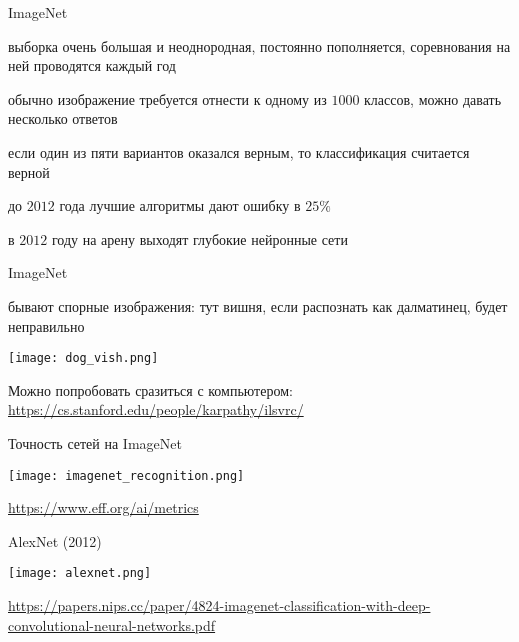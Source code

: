 \documentclass[notes,12pt, aspectratio=169]{beamer}
\newenvironment{wideitemize}{\itemize\addtolength{\itemsep}{10pt}}{\enditemize}
\begin{document}
\begin{frame}{ImageNet}
\begin{wideitemize}
\item  выборка очень большая и неоднородная, постоянно пополняется, соревнования на ней проводятся каждый год

\item обычно изображение требуется отнести к одному из $1000$ классов, можно давать несколько ответов

\item если один из пяти вариантов оказался верным, то классификация считается верной

\item до $2012$ года лучшие алгоритмы дают ошибку в $25\%$

\item в $2012$ году на арену выходят глубокие нейронные сети
\end{wideitemize}
\end{frame}


\begin{frame}{ImageNet}
\begin{wideitemize}
\item бывают спорные изображения: тут вишня, если распознать как далматинец, будет неправильно 

\begin{center}
\texttt{[image: dog\_vish.png]}
\end{center}

\item Можно попробовать сразиться с компьютером:  {\color{blue} \url{https://cs.stanford.edu/people/karpathy/ilsvrc/}} 
\end{wideitemize}
\end{frame}


\begin{frame}{Точность сетей на ImageNet}
\begin{center}
\texttt{[image: imagenet\_recognition.png]}
\end{center}
\vfill %
\footnotesize
\color{blue} \url{https://www.eff.org/ai/metrics}
\end{frame} 


\begin{frame}{AlexNet (2012)}
\begin{center}
\texttt{[image: alexnet.png]}
\end{center}
\vfill %
\tiny
\color{blue} \url{https://papers.nips.cc/paper/4824-imagenet-classification-with-deep-convolutional-neural-networks.pdf}
\end{frame}
\end{document}
